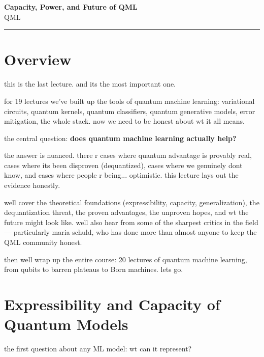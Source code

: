 \documentclass[11pt,a4paper]{article}
\theoremstyle{definition}
\theoremstyle{remark}
\begin{document}
\begin{center}
    {\LARGE \textbf{Capacity, Power, and Future of QML}}\\[8pt]
    {\large QML}\\[12pt]
    \hrule
\end{center}

\vspace{12pt}
\tableofcontents
\newpage

\section{Overview}

this is the last lecture. and its the most important one.

for 19 lectures we've built up the tools of quantum machine learning: variational circuits, quantum kernels, quantum classifiers, quantum generative models, error mitigation, the whole stack. now we need to be honest about wt it all means.

the central question: \textbf{does quantum machine learning actually help?}

the answer is nuanced. there r cases where quantum advantage is provably real, cases where its been disproven (dequantized), cases where we genuinely dont know, and cases where people r being... optimistic. this lecture lays out the evidence honestly.

well cover the theoretical foundations (expressibility, capacity, generalization), the dequantization threat, the proven advantages, the unproven hopes, and wt the future might look like. well also hear from some of the sharpest critics in the field --- particularly maria schuld, who has done more than almost anyone to keep the QML community honest.

then well wrap up the entire course: 20 lectures of quantum machine learning, from qubits to barren plateaus to Born machines. lets go.

\section{Expressibility and Capacity of Quantum Models}

the first question about any ML model: wt can it represent?
\end{document}
